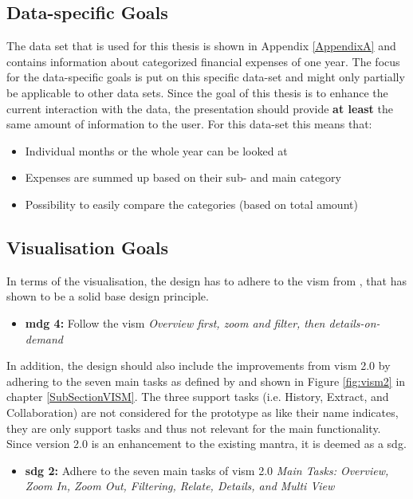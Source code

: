 {%

\subsection{Data-specific Goals}

The data set that is used for this thesis is shown in Appendix \ref{AppendixA} and contains information about categorized financial expenses of one year. The focus for the data-specific goals is put on this specific data-set and might only partially be applicable to other data sets. \newline
Since the goal of this thesis is to enhance the current interaction with the data, the presentation should provide \textbf{at least} the same amount of information to the user. For this data-set this means that:
\begin{itemize}[noitemsep,nolistsep]
	\item Individual months or the whole year can be looked at
	\item Expenses are summed up based on their sub- and main category
	\item Possibility to easily compare the categories (based on total amount)
\end{itemize}





\subsection{Visualisation Goals}

In terms of the visualisation, the design has to adhere to the \gls{vism} from \cite{Shneiderman2005}, that has shown to be a solid base design principle.
\begin{itemize}[noitemsep,nolistsep]
	\item \textbf{\gls{mdg} 4:} Follow the \gls{vism} \newline
	\textit{Overview first, zoom and filter, then details-on-demand}
\end{itemize}
In addition, the design should also include the improvements from \gls{vism} 2.0 by adhering to the seven main tasks as defined by \cite{Stauffer2016} and shown in Figure \ref{fig:vism2} in chapter \ref{SubSectionVISM}. The three support tasks (i.e. History, Extract, and Collaboration) are not considered for the prototype as like their name indicates, they are only support tasks and thus not relevant for the main functionality. Since version 2.0 is an enhancement to the existing mantra, it is deemed as a \gls{sdg}.
\begin{itemize}[noitemsep,nolistsep]
	\item \textbf{\gls{sdg} 2:} Adhere to the seven main tasks of \gls{vism} 2.0 \newline
	\textit{Main Tasks: Overview, Zoom In, Zoom Out, Filtering, Relate, Details, and Multi View}
\end{itemize}




}
